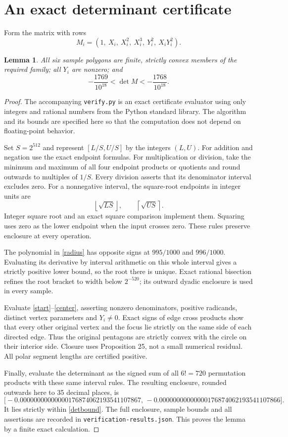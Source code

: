 \documentclass[11pt]{article}
\newtheorem{lemma}{Lemma}
\begin{document}
\section*{An exact determinant certificate}
Form the matrix with rows
\[
 M_i=(1,\ X_i,\ X_i^2,\ X_i^3,\ Y_i^2,\ X_iY_i^2).
\]
\begin{lemma}\label{certificate}
All six sample polygons are finite, strictly convex members of the
required family; all $Y_i$ are nonzero; and
\begin{equation}\label{detbound}
 -\frac{1769}{10^{18}}<\det M<-\frac{1768}{10^{18}}.
\end{equation}
\end{lemma}
\begin{proof}
The accompanying \texttt{verify.py} is an exact certificate evaluator
using only integers and rational numbers from the Python standard
library. The algorithm and its bounds are specified here so that
the computation does not depend on floating-point behavior.

Set $S=2^{512}$ and represent $[L/S,U/S]$ by the integers $(L,U)$.
For addition and negation use the exact endpoint formulas.
For multiplication or division, take the minimum and maximum
of all four endpoint products or quotients and round outwards
to multiples of $1/S$. Every division asserts that its denominator
interval excludes zero. For a nonnegative interval, the square-root
endpoints in integer units are
\[
 \left\lfloor\sqrt{LS}\right\rfloor,\qquad
 \left\lceil\sqrt{US}\right\rceil .
\]
Integer square root and an exact square comparison implement them.
Squaring uses zero as the lower endpoint when the input crosses zero.
These rules preserve enclosure at every operation.

The polynomial in \eqref{radius} has opposite signs at $995/1000$
and $996/1000$. Evaluating its derivative by interval arithmetic on
this whole interval gives a strictly positive lower bound, so
the root there is unique. Exact rational bisection refines the
root bracket to width below $2^{-520}$; its outward dyadic
enclosure is used in every sample.

Evaluate \eqref{start}--\eqref{center}, asserting nonzero
denominators, positive radicands, distinct vertex parameters and
$Y_i\ne0$. Exact signs of edge cross products show that every
other original vertex and the focus lie strictly on the same
side of each directed edge. Thus the original pentagons are
strictly convex with the circle on their interior side.
Closure uses Proposition 25, not a small numerical residual.
All polar segment lengths are certified positive.

Finally, evaluate the determinant as the signed sum of all $6!=720$
permutation products with these same interval rules. The resulting
enclosure, rounded outwards here to 35 decimal places, is
\[
 \bigl[-0.00000000000000176874062193541107867,\,
       -0.00000000000000176874062193541107866\bigr].
\]
It lies strictly within \eqref{detbound}. The full enclosure,
sample bounds and all assertions are recorded in
\texttt{verification-results.json}. This proves the lemma by a
finite exact calculation.
\end{proof}
\end{document}
